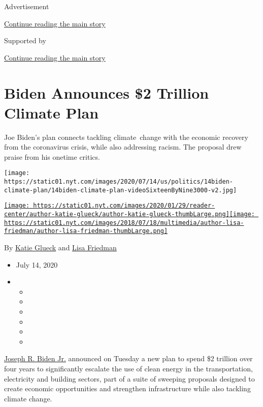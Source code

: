 Advertisement

\protect\hyperlink{after-top}{Continue reading the main story}

Supported by

\protect\hyperlink{after-sponsor}{Continue reading the main story}

\hypertarget{biden-announces-2-trillion-climate-plan}{%
\section{Biden Announces \$2 Trillion Climate
Plan}\label{biden-announces-2-trillion-climate-plan}}

Joe Biden's plan connects tackling climate~change with the economic
recovery from the coronavirus crisis, while also addressing racism. The
proposal drew praise from his onetime critics.

\texttt{[image: https://static01.nyt.com/images/2020/07/14/us/politics/14biden-climate-plan/14biden-climate-plan-videoSixteenByNine3000-v2.jpg]}

\href{https://www.nytimes.com/by/katie-glueck}{\texttt{[image: https://static01.nyt.com/images/2020/01/29/reader-center/author-katie-glueck/author-katie-glueck-thumbLarge.png]}}\href{https://www.nytimes.com/by/lisa-friedman}{\texttt{[image: https://static01.nyt.com/images/2018/07/18/multimedia/author-lisa-friedman/author-lisa-friedman-thumbLarge.png]}}

By \href{https://www.nytimes.com/by/katie-glueck}{Katie Glueck} and
\href{https://www.nytimes.com/by/lisa-friedman}{Lisa Friedman}

\begin{itemize}
\item
  July 14, 2020
\item
  \begin{itemize}
  \item
  \item
  \item
  \item
  \item
  \item
  \end{itemize}
\end{itemize}

\href{https://www.nytimes.com/interactive/2020/us/elections/joe-biden.html}{Joseph
R. Biden Jr.} announced on Tuesday a new plan to spend \$2 trillion over
four years to significantly escalate the use of clean energy in the
transportation, electricity and building sectors, part of a suite of
sweeping proposals designed to create economic opportunities and
strengthen infrastructure while also tackling climate change.

